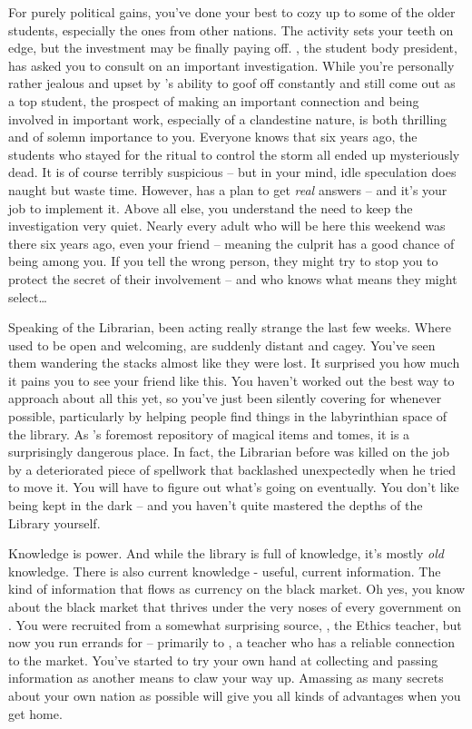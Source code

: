\documentclass[char]{GL2020}
\begin{document}
For purely political gains, you’ve done your best to cozy up to some of the older students, especially the ones from other nations. The activity sets your teeth on edge, but the investment may be finally paying off. \cPresident{}, the student body president, has asked you to consult on an important investigation. While you’re personally rather jealous and upset by \cPresident{}’s ability to goof off constantly and still come out as a top student, the prospect of making an important connection and being involved in important work, especially of a clandestine nature, is both thrilling and of solemn importance to you. Everyone knows that six years ago, the students who stayed for the ritual to control the storm all ended up mysteriously dead. It is of course terribly suspicious -- but in your mind, idle speculation does naught but waste time. However, \cPresident{} has a plan to get \emph{real} answers -- and it’s your job to implement it. Above all else, you understand the need to keep the investigation very quiet. Nearly every adult who will be here this weekend was there six years ago, even your friend \cLibrarian{} -- meaning the culprit has a good chance of being among you. If you tell the wrong person, they might try to stop you to protect the secret of their involvement -- and who knows what means they might select\ldots

Speaking of the Librarian, \cLibrarian{\they} \cLibrarian{\have} been acting really strange the last few weeks. Where \cLibrarian{\they} used to be open and welcoming, \cLibrarian{\they} are suddenly distant and cagey. You’ve seen them wandering the stacks almost like they were lost. It surprised you how much it pains you to see your friend like this. You haven’t worked out the best way to approach \cLibrarian{\them} about all this yet, so you’ve just been silently covering for \cLibrarian{\them} whenever possible, particularly by helping people find things in the labyrinthian space of the library. As \pEarth{}’s foremost repository of magical items and tomes, it is a surprisingly dangerous place. In fact, the Librarian before \cLibrarian{} was killed on the job by a deteriorated piece of spellwork that backlashed unexpectedly when he tried to move it. You will have to figure out what’s going on eventually. You don’t like being kept in the dark -- and you haven’t quite mastered the depths of the Library yourself.

Knowledge is power. And while the library is full of knowledge, it’s mostly \emph{old} knowledge. There is also current knowledge - useful, current information. The kind of information that flows as currency on the black market. Oh yes, you know about the black market that thrives under the very noses of every government on \pEarth{}. You were recruited from a somewhat surprising source, \cEthics{}, the Ethics teacher, but now you run errands for \cEthics{\them} -- primarily to \cChupSecond{}, a teacher who has a reliable connection to the market. You’ve started to try your own hand at collecting and passing information as another means to claw your way up. Amassing as many secrets about your own nation as possible will give you all kinds of advantages when you get home.
\end{document}
